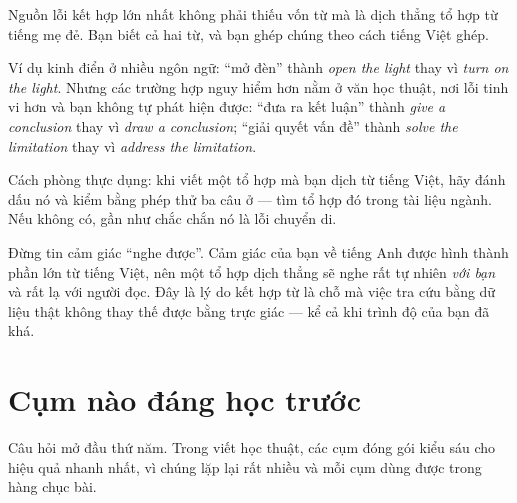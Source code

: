 \documentclass[../../english.tex]{subfiles}
\begin{document}
Nguồn lỗi kết hợp lớn nhất không phải thiếu vốn từ mà là dịch thẳng tổ hợp từ tiếng mẹ đẻ. Bạn biết cả hai từ, và bạn ghép chúng theo cách tiếng Việt ghép.

Ví dụ kinh điển ở nhiều ngôn ngữ: ``mở đèn'' thành \emph{open the light} thay vì \emph{turn on the light}. Nhưng các trường hợp nguy hiểm hơn nằm ở văn học thuật, nơi lỗi tinh vi hơn và bạn không tự phát hiện được: ``đưa ra kết luận'' thành \emph{give a conclusion} thay vì \emph{draw a conclusion}; ``giải quyết vấn đề'' thành \emph{solve the limitation} thay vì \emph{address the limitation}.

Cách phòng thực dụng: khi viết một tổ hợp mà bạn dịch từ tiếng Việt, hãy đánh dấu nó và kiểm bằng phép thử ba câu ở  --- tìm tổ hợp đó trong tài liệu ngành. Nếu không có, gần như chắc chắn nó là lỗi chuyển di.

\begin{cambay}
Đừng tin cảm giác ``nghe được''. Cảm giác của bạn về tiếng Anh được hình thành phần lớn từ tiếng Việt, nên một tổ hợp dịch thẳng sẽ nghe rất tự nhiên \emph{với bạn} và rất lạ với người đọc. Đây là lý do kết hợp từ là chỗ mà việc tra cứu bằng dữ liệu thật không thay thế được bằng trực giác --- kể cả khi trình độ của bạn đã khá.
\end{cambay}

\section{Cụm nào đáng học trước}

Câu hỏi mở đầu thứ năm. Trong viết học thuật, các cụm đóng gói kiểu sáu cho hiệu quả nhanh nhất, vì chúng lặp lại rất nhiều và mỗi cụm dùng được trong hàng chục bài.

\begin{mauau}
\end{mauau}
\end{document}
